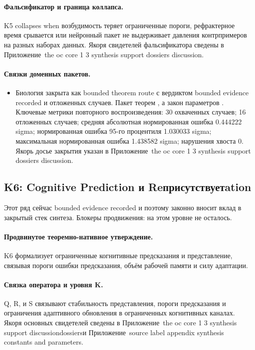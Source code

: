 \paragraph{Фальсификатор и граница коллапса.}
K5 collapses when возбудимость теряет ограниченные пороги, рефрактерное время срывается или нейронный пакет не выдерживает давления контрпримеров на разных наборах данных.
Якоря свидетелей фальсификатора сведены в Приложение~the oc core 1 3 synthesis support dossiers discussion.

\paragraph{Связки доменных пакетов.}
\begin{itemize}[leftmargin=1.6em,nosep]
\item Биология закрыта как bounded theorem route с вердиктом bounded evidence recorded и  отложенных случаев. Пакет теорем , а закон параметров . Ключевые метрики повторного воспроизведения: 30 охваченных случаев; 16 отложенных случаев; средняя абсолютная нормированная ошибка 0.444222 sigma; нормированная ошибка 95-го процентиля 1.030033 sigma; максимальная нормированная ошибка 1.438582 sigma; нарушения хвоста 0. Якорь досье закрытия указан в Приложение~the oc core 1 3 synthesis support dossiers discussion.
\end{itemize}

\subsection{K6: Cognitive Prediction и Reприсутствуетation}
\label{sec:oc-core-1-3-synthesis-k6}
Этот ряд сейчас bounded evidence recorded и поэтому законно вносит вклад в закрытый стек синтеза.
Блокеры продвижения: на этом уровне не осталось.

\paragraph{Продвинутое теоремно-нативное утверждение.}
K6 формализует ограниченные когнитивные предсказания и представление, связывая пороги ошибки предсказания, объём рабочей памяти и силу адаптации.

\paragraph{Связка оператора и уровня K.}
Q, R, и S связывают стабильность представления, пороги предсказания и ограничения адаптивного обновления в ограниченных когнитивных каналах.
Якоря основных свидетелей сведены в Приложение~the oc core 1 3 synthesis support discussiondossiersи Приложение~source label appendix synthesis constants and parameters.

